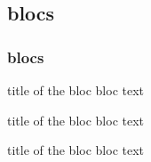 \documentclass[hyperref={pdfpagelabels=false},aspectratio=169]{beamer}
\begin{document}
    \subsection{blocs}
    \begin{frame}
        \frametitle{blocs}

        \begin{block}{title of the bloc}
            bloc text
        \end{block}

        \begin{exampleblock}{title of the bloc}
            bloc text
        \end{exampleblock}

        \begin{alertblock}{title of the bloc}
            bloc text
        \end{alertblock}
    \end{frame}
\end{document}
